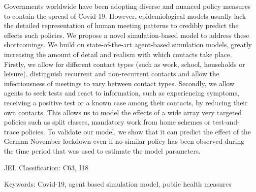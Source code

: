 \noindent
Governments worldwide have been adopting diverse and nuanced policy measures to contain
the spread of Covid-19. However, epidemiological models usually lack the detailed
representation of human meeting patterns to credibly predict the effects such policies.
%
We propose a novel simulation-based model to address these shortcomings. We build on
state-of-the-art agent-based simulation models, greatly increasing the amount of detail
and realism with which contacts take place. Firstly, we allow for different contact
types (such as work, school, households or leisure), distinguish recurrent and
non-recurrent contacts and allow the infectiousness of meetings to vary between contact
types.
Secondly, we allow agents to seek tests and react to information, such as experiencing
symptoms, receiving a positive test or a known case among their contacts, by reducing
their own contacts.
This allows us to model the effects of a wide array very targeted policies such as split
classes, mandatory work from home schemes or test-and-trace policies. To validate our
model, we show that it can predict the effect of the German November lockdown even if no
similar policy has been observed during the time period that was used to estimate the
model parameters.


\vspace{1cm}
\noindent JEL Classification: C63, I18

\noindent Keywords: Covid-19, agent based simulation model, public health measures
